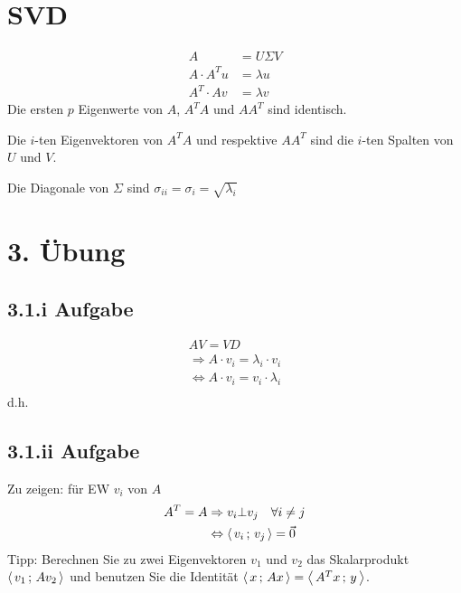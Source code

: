\section*{SVD}
\begin{equation}\begin{split}
    A &= U \Sigma V\\
    A\cdot A^T u &= \lambda u \\
    A^T \cdot A v &= \lambda v
\end{split}\end{equation}
Die ersten $p$ Eigenwerte von $A$, $A^TA$ und $AA^T$ sind identisch.

Die $i$-ten Eigenvektoren von $A^TA$ und respektive $AA^T$ sind die $i$-ten Spalten von $U$ und $V$.

Die Diagonale von $\Sigma$ sind $\sigma_{ii} = \sigma_{i} = \sqrt{\lambda_i}$

\section*{3. Übung}
\subsection*{3.1.i Aufgabe}
\begin{equation}\begin{split}
    AV = VD \\
    \Rightarrow
    A \cdot v_i = \lambda_i \cdot v_i\\
    \Leftrightarrow 
    A \cdot v_i = v_i \cdot \lambda_i \\
\end{split}\end{equation}
d.h.

\subsection*{3.1.ii Aufgabe}
Zu zeigen: für EW $v_i$ von $A$
\begin{equation}\begin{split}
	A^T = A &\Rightarrow v_i \bot v_j \quad\forall i \neq j\\
	&\Leftrightarrow \left\langle\,v_i\,;\,v_j\,\right\rangle = \vec{0}
\end{split}\end{equation}
Tipp: Berechnen Sie zu zwei Eigenvektoren $v_1$ und $v_2$ das Skalarprodukt $\left\langle\,v_1\,;\,Av_2\,\right\rangle$ und benutzen Sie die Identität $\left\langle\,x\,;\,Ax\,\right\rangle = \left\langle\,A^Tx\,;\,y\,\right\rangle$.

